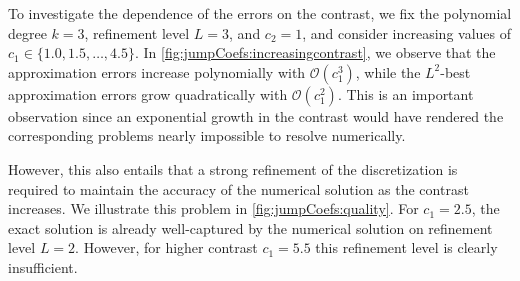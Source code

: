 \documentclass[sn-mathphys-num]{sn-jnl}
\numberwithin{equation}{section}
\begin{document}
To investigate the dependence of the errors on the contrast, we fix the polynomial degree $k = 3$, refinement level $L = 3$, and $c_2 = 1$, and consider increasing values of $c_1 \in \{1.0,1.5,\dots,4.5\}$. In \cref{fig:jumpCoefs:increasingcontrast}, we observe that the approximation errors increase polynomially with $\mathcal{O}(c_1^3)$, while the $L^2$-best approximation errors grow quadratically with $\mathcal{O}(c_1^2)$. This is an important observation since an exponential growth in the contrast would have rendered the corresponding problems nearly impossible to resolve numerically.

However, this also entails that a strong refinement of the discretization is required to maintain the accuracy of the numerical solution as the contrast increases. We illustrate this problem in \cref{fig:jumpCoefs:quality}. For $c_1 = 2.5$, the exact solution is already well-captured by the numerical solution on refinement level $L=2$. However, for higher contrast $c_1 = 5.5$ this refinement level is clearly insufficient. 
\end{document}
